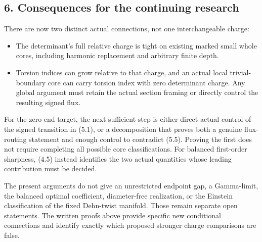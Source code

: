 \documentclass[
  11pt,
]{article}
\providecommand{\tightlist}{%
  \setlength{\itemsep}{0pt}\setlength{\parskip}{0pt}}
\begin{document}
\hypertarget{consequences-for-the-continuing-research}{%
\subsection{6. Consequences for the continuing
research}\label{consequences-for-the-continuing-research}}

There are now two distinct actual connections, not one interchangeable
charge:

\begin{itemize}
\tightlist
\item
  The determinant's full relative charge is tight on existing marked
  small whole cores, including harmonic replacement and arbitrary finite
  depth.
\item
  Torsion indices can grow relative to that charge, and an actual local
  trivial-boundary core can carry torsion index with zero determinant
  charge. Any global argument must retain the actual section framing or
  directly control the resulting signed flux.
\end{itemize}

For the zero-end target, the next sufficient step is either direct
actual control of the signed transition in (5.1), or a decomposition
that proves both a genuine flux-routing statement and enough control to
contradict (5.5). Proving the first does not require completing all
possible core classifications. For balanced first-order sharpness, (4.5)
instead identifies the two actual quantities whose leading contribution
must be decided.

The present arguments do not give an unrestricted endpoint gap, a
Gamma-limit, the balanced optimal coefficient, diameter-free
realization, or the Einstein classification of the fixed Dehn-twist
manifold. Those remain separate open statements. The written proofs
above provide specific new conditional connections and identify exactly
which proposed stronger charge comparisons are false.
\end{document}
